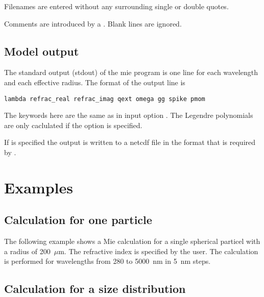 Filenames are entered without any surrounding single or double quotes.

Comments are introduced by a \code{\#}. Blank lines are ignored.

\subsection{Model output}

The standard output (stdout) of the mie program is one line for each 
wavelength and each effective radius.
The format of the output line is
\begin{Verbatim}[fontsize=\footnotesize, frame=single, samepage=true]   
  lambda refrac_real refrac_imag qext omega gg spike pmom
\end{Verbatim}
The keywords here are the same as in input option
. The Legendre polynomials  are only
caclulated if the option  is specified.

If  is specified the output is written to a
netcdf file in the format that is required by .

\section{Examples}

\subsection{Calculation for one particle}

The following example shows a Mie calculation for a single spherical
particel with a radius of 200~$\mu$m. The refractive index is
specified by the user. The calculation is performed for wavelengths
from 280 to 5000~nm in 5~nm steps.

\subsection{Calculation for a size distribution}

